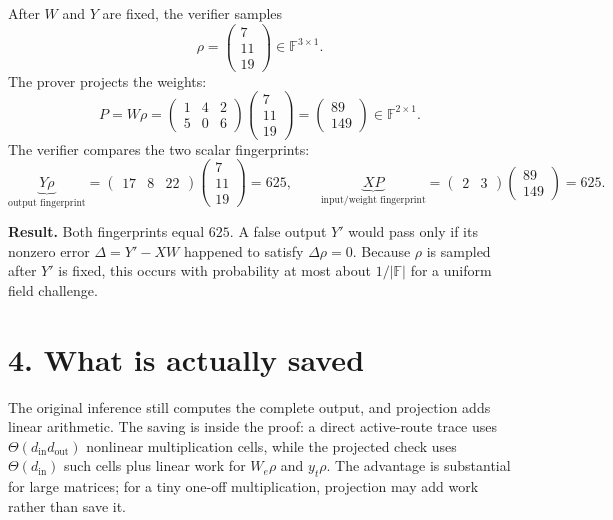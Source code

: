 \documentclass[10pt,a4paper]{article}
\begin{document}
After $W$ and $Y$ are fixed, the verifier samples
\[
\rho=\begin{pmatrix}7\\11\\19\end{pmatrix}\in\mathbb F^{3\times1}.
\]
The prover projects the weights:
\[
P=W\rho
=\begin{pmatrix}1&4&2\\5&0&6\end{pmatrix}
 \begin{pmatrix}7\\11\\19\end{pmatrix}
=\begin{pmatrix}89\\149\end{pmatrix}
\in\mathbb F^{2\times1}.
\]
The verifier compares the two scalar fingerprints:
\[
\underbrace{Y\rho}_{\text{output fingerprint}}
=\begin{pmatrix}17&8&22\end{pmatrix}
 \begin{pmatrix}7\\11\\19\end{pmatrix}
=625,
\qquad
\underbrace{XP}_{\text{input/weight fingerprint}}
=\begin{pmatrix}2&3\end{pmatrix}
 \begin{pmatrix}89\\149\end{pmatrix}
=625.
\]

\begin{resultbox}
\textbf{\color{green}Result.} Both fingerprints equal $625$. A false output $Y'$ would pass only if its
nonzero error $\Delta=Y'-XW$ happened to satisfy $\Delta\rho=0$. Because $\rho$ is sampled after
$Y'$ is fixed, this occurs with probability at most about $1/|\mathbb F|$ for a uniform field challenge.
\end{resultbox}

\section*{4. What is actually saved}

The original inference still computes the complete output, and projection adds linear arithmetic.
The saving is inside the proof: a direct active-route trace uses
$\Theta(d_{\mathrm{in}}d_{\mathrm{out}})$ nonlinear multiplication cells, while the projected check uses
$\Theta(d_{\mathrm{in}})$ such cells plus linear work for $W_e\rho$ and $y_t\rho$.
The advantage is substantial for large matrices; for a tiny one-off multiplication, projection may add work rather than save it.
\end{document}
